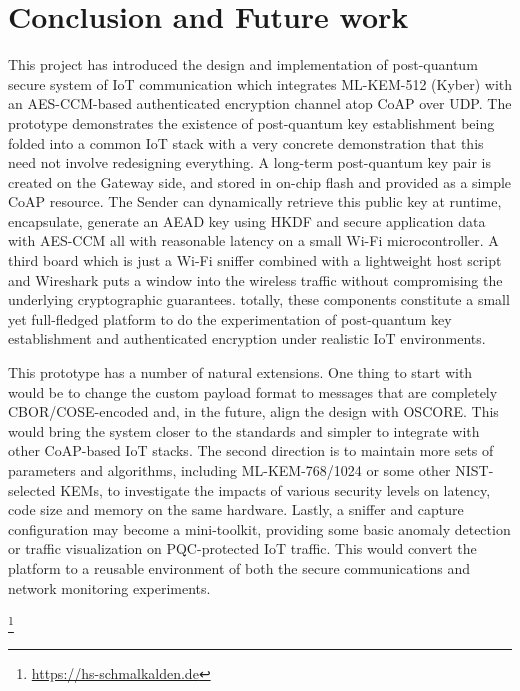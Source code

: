 \documentclass[a4paper]{scrartcl}
\begin{document}
    \section{Conclusion and Future work}
    This project has introduced the design and implementation of post-quantum secure system of IoT communication which integrates ML-KEM-512 (Kyber) with an AES-CCM-based authenticated encryption channel atop CoAP over UDP. The prototype demonstrates the existence of post-quantum key establishment being folded into a common IoT stack with a very concrete demonstration that this need not involve redesigning everything. A long-term post-quantum key pair is created on the Gateway side, and stored in on-chip flash and provided as a simple CoAP resource. The Sender can dynamically retrieve this public key at runtime, encapsulate, generate an AEAD key using HKDF and secure application data with AES-CCM all with reasonable latency on a small Wi-Fi microcontroller. A third board which is just a Wi-Fi sniffer combined with a lightweight host script and Wireshark puts a window into the wireless traffic without compromising the underlying cryptographic guarantees. totally, these components constitute a small yet full-fledged platform to do the experimentation of post-quantum key establishment and authenticated encryption under realistic IoT environments.

    This prototype has a number of natural extensions. One thing to start with would be to change the custom payload format to messages that are completely CBOR/COSE-encoded and, in the future, align the design with OSCORE. This would bring the system closer to the standards and simpler to integrate with other CoAP-based IoT stacks. The second direction is to maintain more sets of parameters and algorithms, including ML-KEM-768/1024 or some other NIST-selected KEMs, to investigate the impacts of various security levels on latency, code size and memory on the same hardware. Lastly, a sniffer and capture configuration may become a mini-toolkit, providing some basic anomaly detection or traffic visualization on PQC-protected IoT traffic. This would convert the platform to a reusable environment of both the secure communications and network monitoring experiments.

    
	
	
	\footnote{\url{https://hs-schmalkalden.de}}
	
	
	
	
	
	\printbibliography[title={References}]
\end{document}
